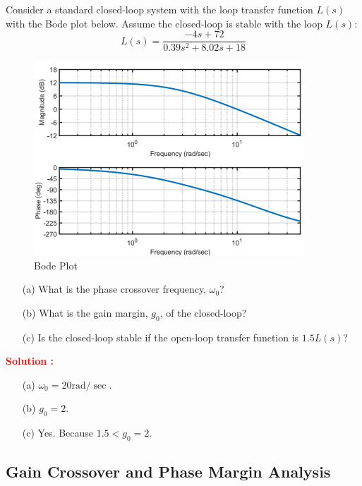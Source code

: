 \documentclass[12pt]{article}
\begin{document}
Consider a standard closed-loop system with the loop transfer function $L(s)$ with the Bode plot below.  Assume the closed-loop is stable with the loop $L(s)$:
\begin{equation*}
    L(s) = \frac{-4s+72}{0.39s^2+8.02s+18}
\end{equation*}
\begin{figure}[H]
\centering
\includegraphics[width=0.9\textwidth]{figs/6.1.png}
\caption{Bode Plot}
\end{figure}
\begin{itemize}
    \item[(a)] What is the phase crossover frequency, $\omega_0$?
    \item[(b)] What is the gain margin, $g_0$, of the closed-loop? 
    \item[(c)] Is the closed-loop stable if the open-loop transfer function is $1.5L(s)$?
    \end{itemize}
\textbf{\textcolor{red}{Solution :}} \\
\begin{itemize}
    \item[(a)] $\omega_0 = 20 \text{rad}/\sec.$
    \item[(b)] $g_0 = 2$.
    \item[(c)] Yes. Because $1.5 < g_0 = 2$.
\end{itemize}

\clearpage
\subsection{Gain Crossover and Phase Margin Analysis}
\end{document}

